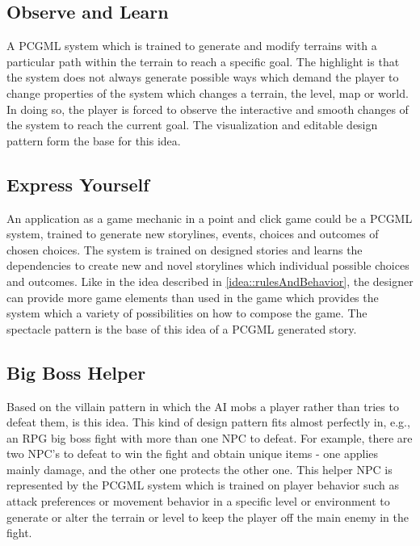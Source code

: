 \documentclass[MGS,Master,english]{twbook}%
\begin{document}
\subsection{Observe and Learn} \label{idea::observeAndLearn}
A PCGML system which is trained to generate and modify terrains with a particular path within the terrain to reach a specific goal. The highlight is that the system does not always generate possible ways which demand the player to change properties of the system which changes a terrain, the level, map or world. In doing so, the player is forced to observe the interactive and smooth changes of the system to reach the current goal. The visualization and editable design pattern form the base for this idea.

\subsection{Express Yourself} \label{idea::expressYourself}
An application as a game mechanic in a point and click game could be a PCGML system, trained to generate new storylines, events, choices and outcomes of chosen choices. The system is trained on designed stories and learns the dependencies to create new and novel storylines which individual possible choices and outcomes. Like in the idea described in \ref{idea::rulesAndBehavior}, the designer can provide more game elements than used in the game which provides the system which a variety of possibilities on how to compose the game. The spectacle pattern is the base of this idea of a PCGML generated story.

\subsection{Big Boss Helper} \label{idea::bigBossHelper}
Based on the villain pattern in which the AI mobs a player rather than tries to defeat them, is this idea. This kind of design pattern fits almost perfectly in, e.g., an RPG big boss fight with more than one \ac{NPC} to defeat. For example, there are two NPC’s to defeat to win the fight and obtain unique items - one applies mainly damage, and the other one protects the other one. This helper NPC is represented by the PCGML system which is trained on player behavior such as attack preferences or movement behavior in a specific level or environment to generate or alter the terrain or level to keep the player off the main enemy in the fight.
\end{document}
